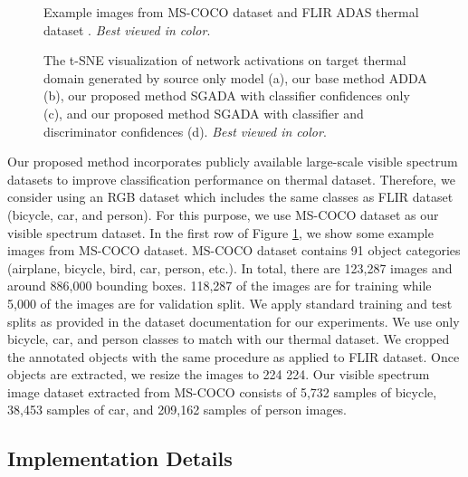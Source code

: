 \documentclass[final]{cvpr}
\begin{document}
\begin{figure}[t]
\centering
{}
\vspace{2mm}
\caption{Example images from MS-COCO dataset \cite{mscoco} and FLIR ADAS thermal dataset \cite{flir}. \textit{Best viewed in color}.}
\label{fig:dataset}
\end{figure}

\begin{figure*}[ht]
\centering
    \vspace{3mm}
    \caption{The t-SNE visualization of network activations on target thermal domain generated by source only model (a), our base method ADDA \cite{adda} (b), our proposed method SGADA with classifier confidences only (c), and our proposed method SGADA with classifier and discriminator confidences (d). \textit{Best viewed in color}.}
    \label{fig:tsne}
\end{figure*}

Our proposed method incorporates publicly available large-scale visible spectrum datasets to improve classification performance on thermal dataset. Therefore, we consider using an RGB dataset which includes the same classes as FLIR dataset \cite{flir} (bicycle, car, and person). For this purpose, we use MS-COCO dataset \cite{mscoco} as our visible spectrum dataset. In the first row of Figure \ref{fig:dataset}, we show some example images from MS-COCO dataset. MS-COCO dataset contains 91 object categories (airplane, bicycle, bird, car, person, etc.). In total, there are 123,287 images and around 886,000 bounding boxes. 118,287 of the images are for training while 5,000 of the images are for validation split. We apply standard training and test splits as provided in the dataset documentation for our experiments. We use only bicycle, car, and person classes to match with our thermal dataset. We cropped the annotated objects with the same procedure as applied to FLIR dataset. Once objects are extracted, we resize the images to 224  224. Our visible spectrum image dataset extracted from MS-COCO consists of 5,732 samples of bicycle, 38,453 samples of car, and 209,162 samples of person images.

\subsection{Implementation Details}
\label{sec:implementation}
\end{document}
